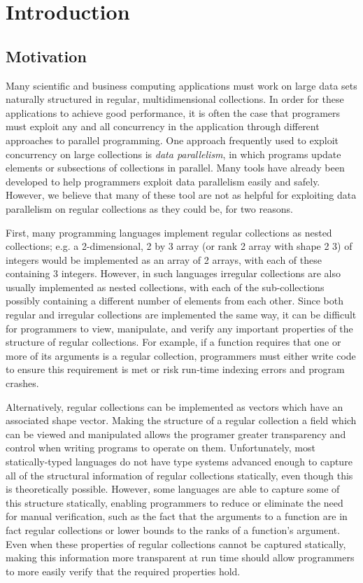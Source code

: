 \chapter{Introduction}

\section{Motivation}
Many scientific and business computing applications must work on large data sets naturally structured in regular, multidimensional collections.
In order for these applications to achieve good performance, it is often the case that programers must exploit any and all concurrency in the application through different approaches to parallel programming.
One approach frequently used to exploit concurrency on large collections is \textit{data parallelism}, in which programs update elements or subsections of collections in parallel.
Many tools have already been developed to help programmers exploit data parallelism easily and safely. %
However, we believe that many of these tool are not as helpful for exploiting data parallelism on regular collections as they could be, for two reasons.

First, many programming languages implement regular collections as nested collections;
e.g. a 2-dimensional, 2 by 3 array (or rank 2 array with shape 2 3) of integers would be implemented as 
an array of 2 arrays, with each of these containing 3 integers. %
However, in such languages irregular collections are also usually implemented as nested collections, 
with each of the sub-collections possibly containing a different number of elements from each other.
Since both regular and irregular collections are implemented the same way,
it can be difficult for programmers to view, manipulate, and verify any important properties of the structure of regular collections.
For example, if a function requires that one or more of its arguments is a regular collection, programmers must either write code to ensure this requirement is met or risk run-time indexing errors and program crashes.

Alternatively, regular collections can be implemented as vectors which have an associated shape vector. 
Making the structure of a regular collection a field which can be viewed and manipulated 
allows the programer greater transparency and control when writing programs to operate on them.
Unfortunately, most statically-typed languages do not have type systems advanced enough 
to capture all of the structural information of regular collections statically, even though this is theoretically possible. %
However, some languages are able to capture some of this structure statically, \cite{boost} \cite{sac} \cite{dph}
enabling programmers to reduce or eliminate the need for manual verification, 
such as the fact that the arguments to a function are in fact regular collections or lower bounds to the ranks of a function's argument.
Even when these properties of regular collections cannot be captured statically, making this information more transparent at run time 
should allow programmers to more easily verify that the required properties hold.

